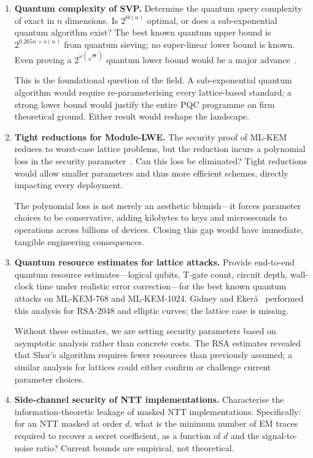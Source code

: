 \begin{enumerate}

\item \textbf{Quantum complexity of SVP.}
Determine the quantum query complexity of exact \svp{} in $n$ dimensions.  Is $2^{\Theta(n)}$ optimal, or does a sub-exponential quantum algorithm exist?  The best known quantum upper bound is $2^{0.265n + o(n)}$ from quantum sieving; no super-linear lower bound is known.  Even proving a $2^{\omega(\sqrt{n})}$ quantum lower bound would be a major advance~\cite{Regev2009}.

This is the foundational question of the field.  A sub-exponential quantum algorithm would require re-parameterising every lattice-based standard; a strong lower bound would justify the entire PQC programme on firm theoretical ground.  Either result would reshape the landscape.

\item \textbf{Tight reductions for Module-LWE.}
The security proof of ML-KEM reduces \mlwe{} to worst-case lattice problems, but the reduction incurs a polynomial loss in the security parameter~\cite{Peikert2016}.  Can this loss be eliminated?  Tight reductions would allow smaller parameters and thus more efficient schemes, directly impacting every deployment.

The polynomial loss is not merely an aesthetic blemish---it forces parameter choices to be conservative, adding kilobytes to keys and microseconds to operations across billions of devices.  Closing this gap would have immediate, tangible engineering consequences.

\item \textbf{Quantum resource estimates for lattice attacks.}
Provide end-to-end quantum resource estimates---logical qubits, T-gate count, circuit depth, wall-clock time under realistic error correction---for the best known quantum attacks on ML-KEM-768 and ML-KEM-1024.  Gidney and Eker\aa~\cite{GidneyEkera2021} performed this analysis for RSA-2048 and elliptic curves; the lattice case is missing.

Without these estimates, we are setting security parameters based on asymptotic analysis rather than concrete costs.  The RSA estimates revealed that Shor's algorithm requires fewer resources than previously assumed; a similar analysis for lattices could either confirm or challenge current parameter choices.

\item \textbf{Side-channel security of NTT implementations.}
Characterise the information-theoretic leakage of masked NTT implementations.  Specifically: for an NTT masked at order $d$, what is the minimum number of EM traces required to recover a secret coefficient, as a function of $d$ and the signal-to-noise ratio?  Current bounds are empirical, not theoretical.


\end{enumerate}
